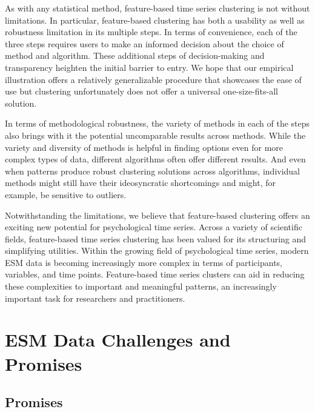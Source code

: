 \documentclass[man, 12pt, a4paper, mask, floatsintext]{apa7}
\theoremstyle{break}
\theoremstyle{plain}
\begin{document}
As with any statistical method, feature-based time series clustering is not without limitations. 
In particular, feature-based clustering has both a usability as well as robustness limitation in its multiple steps. In terms of convenience, each of the three steps requires users to make an informed decision about the choice of method and algorithm. These additional steps of decision-making and transparency heighten the initial barrier to entry. We hope that our empirical illustration offers a relatively generalizable procedure that showcases the ease of use but clustering unfortunately does not offer a universal one-size-fits-all solution. 

In terms of methodological robustness, the variety of methods in each of the steps also brings with it the potential uncomparable results across methods. While the variety and diversity of methods is helpful in finding options even for more complex types of data, different algorithms often offer different results. And even when patterns produce robust clustering solutions across algorithms, individual methods might still have their ideosyncratic shortcomings and might, for example, be sensitive to outliers. 

Notwithstanding the limitations, we believe that feature-based clustering offers an exciting new potential for psychological time series. Across a variety of scientific fields, feature-based time series clustering has been valued for its structuring and simplifying utilities. Within the growing field of psychological time series, modern ESM data is becoming increasingly more complex in terms of participants, variables, and time points. Feature-based time series clusters can aid in reducing these complexities to important and meaningful patterns, an increasingly important task for researchers and practitioners. 



%




\printbibliography

\appendix

\section{ESM Data Challenges and Promises}
\label{app:ChallengesAppendix}

\subsection{Promises}
\end{document}
